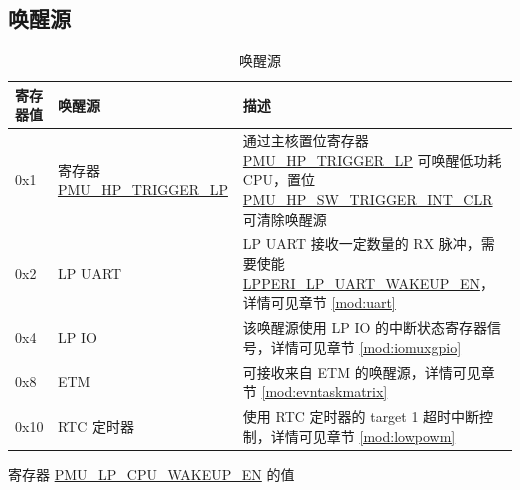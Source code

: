 \documentclass[main\_\_CN.tex]{subfiles}
\begin{document}
\subsection{唤醒源}

    \begin{table}[H]
    \centering
    \caption{唤醒源}
    \label{tab:ulp-wake-sources}
    \begin{threeparttable}
    \begin{tabular}{| l | l | m{6cm}|}
    \hline
    \rowcolor{lightgray}
    寄存器值\tnote{1} & 唤醒源 & 描述  \\\hline

    0x1  & 寄存器 \hyperref[fielddesc:PMUHPTRIGGERLP]{PMU\_HP\_TRIGGER\_LP} & 通过主核置位寄存器 \hyperref[fielddesc:PMUHPTRIGGERLP]{PMU\_HP\_TRIGGER\_LP} 可唤醒低功耗 CPU，置位 \hyperref[fielddesc:PMUHPSWTRIGGERINTCLR]{PMU\_HP\_SW\_TRIGGER\_INT\_CLR} 可清除唤醒源\\\hline
    0x2  & LP UART & LP UART 接收一定数量的 RX 脉冲，需要使能 \hyperref[fielddesc:LPPERILPUARTWAKEUPEN]{LPPERI\_LP\_UART\_WAKEUP\_EN}，详情可见章节 \ref{mod:uart} \textit{\nameref{mod:uart}} \\\hline
    0x4  & LP IO & 该唤醒源使用 LP IO 的中断状态寄存器信号，详情可见章节 \ref{mod:iomuxgpio} \textit{\nameref{mod:iomuxgpio}} \\\hline
    0x8  & ETM & 可接收来自 ETM 的唤醒源，详情可见章节 \ref{mod:evntaskmatrix} \textit{\nameref{mod:evntaskmatrix}} \\\hline
    0x10 & RTC 定时器 & 使用 RTC 定时器的 target 1 超时中断控制，详情可见章节 \ref{mod:lowpowm} \textit{\nameref{mod:lowpowm}} \\\hline
\end{tabular}
    \begin{tablenotes}
        \item[1] 寄存器 \hyperref[fielddesc:PMULPCPUWAKEUPEN]{PMU\_LP\_CPU\_WAKEUP\_EN} 的值
    \end{tablenotes}
    \end{threeparttable}
\end{table}




\end{document}

